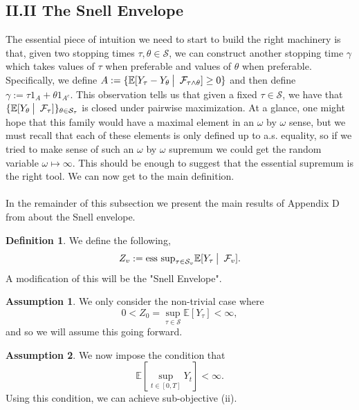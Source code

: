 \documentclass[12pt]{article}
\newcommand{\cF}{\mathcal{F}}
\newcommand{\cS}{\mathcal{S}}
\newcommand{\E}{\mathbb{E}}
\newcommand{\quantifyspace}{\hspace{2px} \big | \hspace{5px}}
\newcommand{\cheekynewline}{$\text{ }$\\}
\newcommand{\esssup}{\text{ess sup}}
\theoremstyle{definition}
\newtheorem{defn}{Definition}
\newtheorem{assume}{Assumption}
\begin{document}
\subsection*{\quad II.II The Snell Envelope}\label{sec:II.II}
The essential piece of intuition we need to start to build the right machinery
is that, given two stopping times $\tau, \theta \in \cS$, we can construct another stopping time $\gamma$ which takes values of $\tau$ when preferable and values of $\theta$ when preferable.
Specifically, we define $A := \{\E[Y_\tau - Y_\theta \quantifyspace \cF_{\tau \wedge \theta}] \geq 0\}$ and then define $\gamma := \tau 1_A + \theta 1_{A^c}$.
This observation tells us that
given a fixed $\tau \in \cS$, we have that $\{\E[Y_\theta \quantifyspace \cF_\tau] \}_{\theta \in \cS_\tau}$ is closed under pairwise maximization.
At a glance, one might hope that this family would have a maximal element in an $\omega$ by $\omega$ sense, but we must recall that each of these elements is only defined up to a.s. equality, so if we tried to make sense of such an $\omega$ by $\omega$ supremum we could get the random variable $\omega \mapsto \infty$. 
This should be enough to suggest that the essential supremum is the right tool. We can now get to the main definition. 
\\
\\
In the remainder of this subsection we present the main results of Appendix D from \cite{karatzas1998} about the Snell envelope. \\


\begin{defn}
    We define the following,
    \[
        Z_v := \esssup_{\tau \in \cS_v} \E[Y_\tau \quantifyspace \cF_v].
    \]
    A modification of this will be the "Snell Envelope".
\end{defn}

\begin{assume}
    We only consider the non-trivial case where
    \[
        0 < Z_0 = \sup_{\tau \in \cS} \E[Y_\tau] < \infty,
    \]
    and so we will assume this going forward. \\
\end{assume}

\begin{assume}
    We now impose the condition that
    \[
        \E[\sup_{t \in [0,T]} Y_t] < \infty.
    \]
    Using this condition, we can achieve sub-objective (ii).
\end{assume}
\cheekynewline
\end{document}
